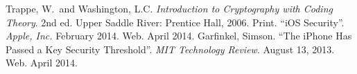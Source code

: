 \begin{thebibliography}{1}
 Trappe, W.\ and Washington, L.C. \textit{Introduction to Cryptography with Coding Theory}. 2nd ed. Upper Saddle River: Prentice Hall, 2006. Print.
 ``iOS Security''. \textit{Apple, Inc.} February 2014. Web. April 2014.
 Garfinkel, Simson. ``The iPhone Has Passed a Key Security Threshold''. \textit{MIT Technology Review}. August 13, 2013. Web. April 2014.
\end{thebibliography}
